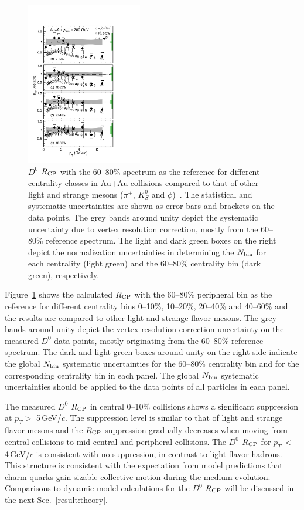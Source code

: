 \documentclass[%
 reprint,	
 amsmath,amssymb,
 aps,
 prc,
]{revtex4-1}
\begin{document}
\begin{figure}
\centering
\includegraphics[width=0.45\textwidth]{fig/D0_Rcp1.pdf}
\caption{$D^{0}$ $R_{\rm CP}$ with the 60--80\% spectrum as the reference for different centrality classes in Au+Au collisions compared to that of other light and strange mesons ($\pi^{\pm}$, $K^0_{S}$ and $\phi$)~\cite{Adams2006_Identified,Abelev2009,Agakishiev2012}. The statistical and systematic uncertainties are shown as error bars and brackets on the data points. The grey bands around unity depict the systematic uncertainty due to vertex resolution correction, mostly from the 60--80\% reference spectrum. The light and dark green boxes on the right depict the normalization uncertainties in determining the $N_{\rm bin}$ for each centrality (light green) and the 60--80\% centrality bin (dark green), respectively.}
\label{fig:D0_Rcp} 
\end{figure}

Figure~\ref{fig:D0_Rcp} shows the calculated $R_{\rm CP}$ with the 60--80\% peripheral bin as the reference for different centrality bins 0--10\%, 10--20\%, 20--40\% and 40--60\% and the results are compared to other light and strange flavor mesons. The grey bands around unity depict the vertex resolution correction uncertainty on the measured $D^0$ data points, mostly originating from the 60--80\% reference spectrum. The dark and light green boxes around unity on the right side indicate the global $N_{\rm bin}$ systematic uncertainties for the 60--80\% centrality bin and for the corresponding centrality bin in each panel. The global $N_{\rm bin}$ systematic uncertainties should be applied to the data points of all particles in each panel.

The measured $D^0$ $R_{\rm CP}$ in central 0--10\% collisions shows a significant suppression at $p_{T}>$ 5\,GeV/$c$. The suppression level is similar to that of light and strange flavor mesons and the $R_{\rm CP}$ suppression gradually decreases when moving from central collisions to mid-central and peripheral collisions. The $D^0$ $R_{\rm CP}$ for $p_{T}$\,$<$\,4\,GeV/$c$ is consistent with no suppression, in contrast to light-flavor hadrons. This structure is consistent with the expectation from model predictions that charm quarks gain sizable collective motion during the medium evolution. Comparisons to dynamic model calculations for the $D^0$ $R_{\rm CP}$ will be discussed in the next Sec.~\ref{result:theory}.
\end{document}
